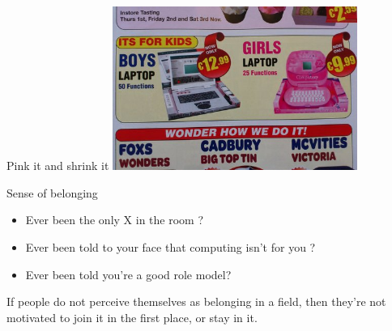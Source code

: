\documentclass[xcolor=table,aspectratio=169]{beamer}
\begin{document}
\begin{frame}{Pink it and shrink it}
	\includegraphics[width=8cm]{figs/laptop_pink.jpg}
\end{frame}
\begin{frame}{Sense of belonging }
	\begin{itemize}
		\item Ever been the only X in the room ?
			\pause
		\item Ever been told to your face that computing isn't for you ?
			\pause
		\item Ever been told you're a good role model?
	\end{itemize}
			\pause
If people do not perceive themselves as belonging in a field, then they're not motivated to join it in the first place, or stay in it. 

\end{frame}
\end{document}
